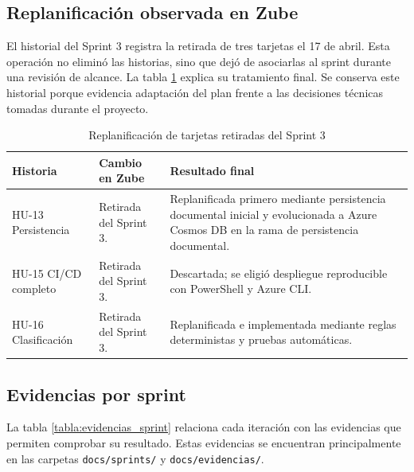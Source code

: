 \subsection{Replanificación observada en Zube}

El historial del Sprint 3 registra la retirada de tres tarjetas el 17 de abril. Esta operación no eliminó las historias, sino que dejó de asociarlas al sprint durante una revisión de alcance. La tabla \ref{tabla:replanificacion-zube} explica su tratamiento final. Se conserva este historial porque evidencia adaptación del plan frente a las decisiones técnicas tomadas durante el proyecto.

\begin{table}[ht]
\centering
\small
\begin{tabularx}{\textwidth}{l X X}
\textbf{Historia} & \textbf{Cambio en Zube} & \textbf{Resultado final} \\
\hline
HU-13 Persistencia & Retirada del Sprint 3. & Replanificada primero mediante persistencia documental inicial y evolucionada a Azure Cosmos DB en la rama de persistencia documental. \\
HU-15 CI/CD completo & Retirada del Sprint 3. & Descartada; se eligió despliegue reproducible con PowerShell y Azure CLI. \\
HU-16 Clasificación & Retirada del Sprint 3. & Replanificada e implementada mediante reglas deterministas y pruebas automáticas. \\
\end{tabularx}
\caption{Replanificación de tarjetas retiradas del Sprint 3}
\label{tabla:replanificacion-zube}
\end{table}

\subsection{Evidencias por sprint}

La tabla \ref{tabla:evidencias_sprint} relaciona cada iteración con las evidencias que permiten comprobar su resultado. Estas evidencias se encuentran principalmente en las carpetas \texttt{docs/sprints/} y \texttt{docs/evidencias/}.


